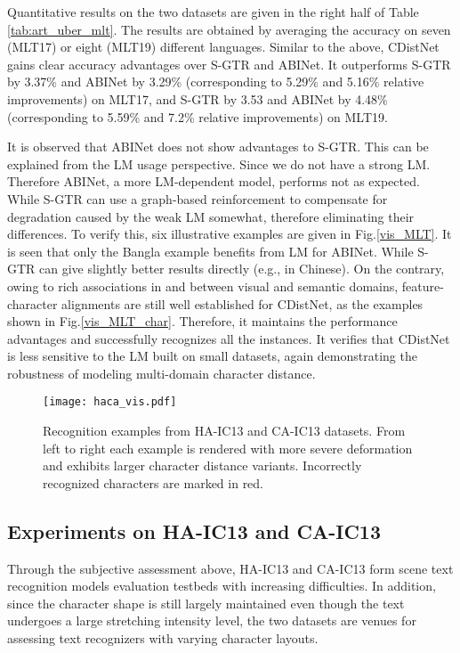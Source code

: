 Quantitative results on the two datasets are given in the right half of Table \ref{tab:art_uber_mlt}. The results are obtained by averaging the accuracy on seven (MLT17) or eight (MLT19) different languages. Similar to the above, CDistNet gains clear accuracy advantages over S-GTR and ABINet. It outperforms S-GTR by 3.37\% and ABINet by 3.29\% (corresponding to 5.29\% and 5.16\% relative improvements) on MLT17, and S-GTR by 3.53 and ABINet by 4.48\% (corresponding to 5.59\% and 7.2\% relative improvements) on MLT19. 

It is observed that ABINet does not show advantages to S-GTR. This can be explained from the LM usage perspective. Since we do not have a strong LM. Therefore ABINet, a more LM-dependent model, performs not as expected. While S-GTR can use a graph-based reinforcement to compensate for degradation caused by the weak LM somewhat, therefore eliminating their differences. To verify this, six illustrative examples are given in Fig.\ref{vis_MLT}. It is seen that only the Bangla example benefits from LM for ABINet. While S-GTR can give slightly better results directly (e.g., in Chinese). On the contrary, owing to rich associations in and between visual and semantic domains, feature-character alignments are still well established for CDistNet, as the examples shown in Fig.\ref{vis_MLT_char}. Therefore, it maintains the performance advantages and successfully recognizes all the instances. It verifies that CDistNet is less sensitive to the LM built on small datasets, again demonstrating the robustness of modeling multi-domain character distance.

\begin{figure*}[]
\centering
\texttt{[image: haca\_vis.pdf]} 
\caption{Recognition examples from HA-IC13 and CA-IC13 datasets. From left to right each example is rendered with more severe deformation and exhibits larger character distance variants. Incorrectly recognized characters are marked in red.}
\label{vis_haca}
\end{figure*}

\subsection{Experiments on HA-IC13 and CA-IC13}
Through the subjective assessment above, HA-IC13 and CA-IC13 form scene text recognition models evaluation testbeds with increasing difficulties. In addition, since the character shape is still largely maintained even though the text undergoes a large stretching intensity level, the two datasets are venues for assessing text recognizers with varying character layouts.

